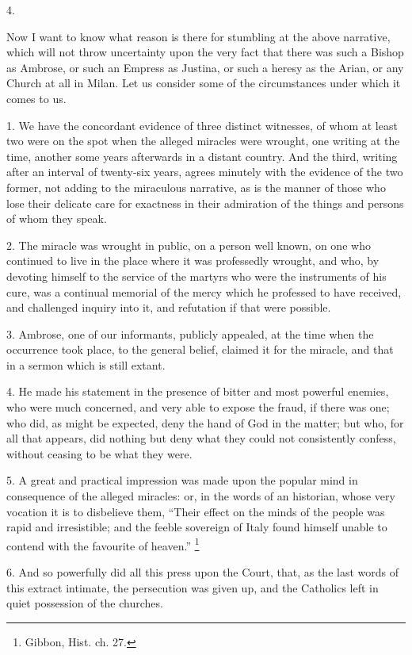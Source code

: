 4.

Now I want to know what reason is there for stumbling at the above
narrative, which will not throw uncertainty upon the very fact that
there was such a Bishop as Ambrose, or such an Empress as Justina, or
such a heresy as the Arian, or any Church at all in Milan. Let us
consider some of the circumstances under which it comes to us.

1. We have the concordant evidence of three distinct witnesses, of
whom at least two were on the spot when the alleged miracles were
wrought, one writing at the time, another some years afterwards in a
distant country. And the third, writing after an interval of
twenty-six years, agrees minutely with the evidence of the two former,
not adding to the miraculous narrative, as is the manner of those who
lose their delicate care for exactness in their admiration of the
things and persons of whom they speak.

2. The miracle was wrought in public, on a person well known, on
one who continued to live in the place where it was professedly
wrought, and who, by devoting himself to the service of the martyrs
who were the instruments of his cure, was a continual memorial
of the mercy which he professed to have received, and challenged
inquiry into it, and refutation if that were possible.

3. Ambrose, one of our informants, publicly appealed, at the time
when the occurrence took place, to the general belief, claimed it for
the miracle, and that in a sermon which is still extant.

4. He made his statement in the presence of bitter and most
powerful enemies, who were much concerned, and very able to expose the
fraud, if there was one; who did, as might be expected, deny the hand
of God in the matter; but who, for all that appears, did nothing but
deny what they could not consistently confess, without ceasing to be
what they were.

5. A great and practical impression was made upon the popular mind
in consequence of the alleged miracles: or, in the words of an
historian, whose very vocation it is to disbelieve them, ``Their
effect on the minds of the people was rapid and irresistible; and the
feeble sovereign of Italy found himself unable to contend with the
favourite of heaven.'' \footnote{Gibbon, Hist.
ch. 27.}

6. And so powerfully did all this press upon the Court, that, as
the last words of this extract intimate, the persecution was given up,
and the Catholics left in quiet possession of the churches.

